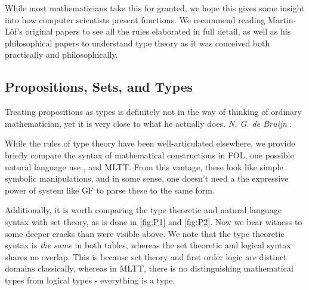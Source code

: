 While most mathematicians take this for granted, we hope this gives some insight
into how computer scientists present functions. We recommend reading
Martin-Löf's original papers \cite{ml1984} \cite{ml79} to see all the rules
elaborated in full detail, as well as his philosophical papers
\cite{mlMeanings} \cite{mlTruth} to understand type theory as it was conceived
both practically and philosophically.

\subsection{Propositions, Sets, and Types}
\begin{displayquote}
Treating propositions as types is definitely not in the way of thinking of
ordinary mathematician, yet it is very close to what he actually does. 
\emph{N. G. de Bruijn} \cite{deBruijn1983}.
\end{displayquote}

While the rules of type theory have been well-articulated elsewhere, we provide
briefly compare the syntax of mathematical constructions in FOL, one possible
natural language use \cite{rantaLog}, and MLTT. From this vantage, these look
like simple symbolic manipulations, and in some sense, one doesn't need a the
expressive power of system like GF to parse these to the same form.

Additionally, it is worth comparing the type theoretic and natural language
syntax with set theory, as is done in \autoref{fig:P1} and \autoref{fig:P2}. Now
we bear witness to some deeper cracks than were visible above. We note that the
type theoretic syntax is \emph{the same} in both tables, whereas the set
theoretic and logical syntax shares no overlap. This is because set theory and
first order logic are distinct domains classically, whereas in MLTT,
there is no distinguishing mathematical types from logical types - everything is
a type.

